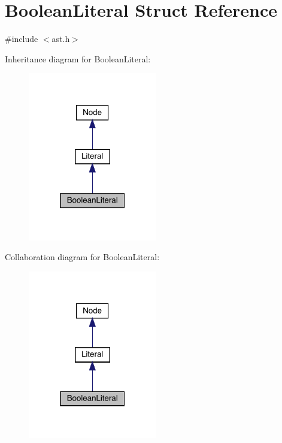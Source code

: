\hypertarget{struct_boolean_literal}{}\section{Boolean\+Literal Struct Reference}
\label{struct_boolean_literal}


{\ttfamily \#include $<$ast.\+h$>$}



Inheritance diagram for Boolean\+Literal\+:\nopagebreak
\begin{figure}[H]
\begin{center}
\leavevmode
\includegraphics[width=160pt]{struct_boolean_literal__inherit__graph}
\end{center}
\end{figure}


Collaboration diagram for Boolean\+Literal\+:\nopagebreak
\begin{figure}[H]
\begin{center}
\leavevmode
\includegraphics[width=160pt]{struct_boolean_literal__coll__graph}
\end{center}
\end{figure}
